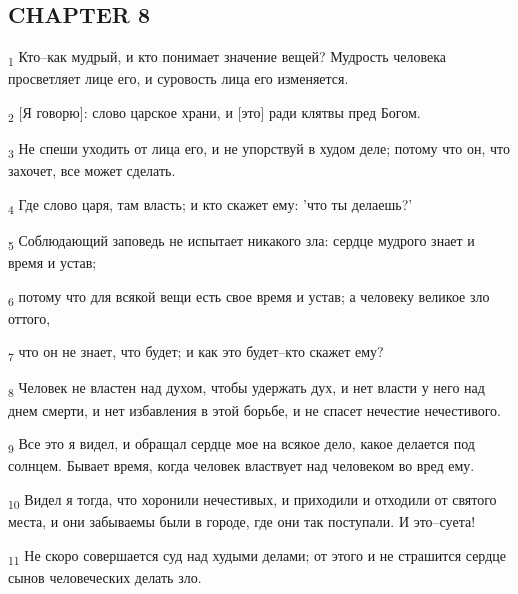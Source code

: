 \subsection{CHAPTER 8}
\begin{tcolorbox}
\textsubscript{1} Кто--как мудрый, и кто понимает значение вещей? Мудрость человека просветляет лице его, и суровость лица его изменяется.
\end{tcolorbox}
\begin{tcolorbox}
\textsubscript{2} [Я говорю]: слово царское храни, и [это] ради клятвы пред Богом.
\end{tcolorbox}
\begin{tcolorbox}
\textsubscript{3} Не спеши уходить от лица его, и не упорствуй в худом деле; потому что он, что захочет, все может сделать.
\end{tcolorbox}
\begin{tcolorbox}
\textsubscript{4} Где слово царя, там власть; и кто скажет ему: 'что ты делаешь?'
\end{tcolorbox}
\begin{tcolorbox}
\textsubscript{5} Соблюдающий заповедь не испытает никакого зла: сердце мудрого знает и время и устав;
\end{tcolorbox}
\begin{tcolorbox}
\textsubscript{6} потому что для всякой вещи есть свое время и устав; а человеку великое зло оттого,
\end{tcolorbox}
\begin{tcolorbox}
\textsubscript{7} что он не знает, что будет; и как это будет--кто скажет ему?
\end{tcolorbox}
\begin{tcolorbox}
\textsubscript{8} Человек не властен над духом, чтобы удержать дух, и нет власти у него над днем смерти, и нет избавления в этой борьбе, и не спасет нечестие нечестивого.
\end{tcolorbox}
\begin{tcolorbox}
\textsubscript{9} Все это я видел, и обращал сердце мое на всякое дело, какое делается под солнцем. Бывает время, когда человек властвует над человеком во вред ему.
\end{tcolorbox}
\begin{tcolorbox}
\textsubscript{10} Видел я тогда, что хоронили нечестивых, и приходили и отходили от святого места, и они забываемы были в городе, где они так поступали. И это--суета!
\end{tcolorbox}
\begin{tcolorbox}
\textsubscript{11} Не скоро совершается суд над худыми делами; от этого и не страшится сердце сынов человеческих делать зло.
\end{tcolorbox}

